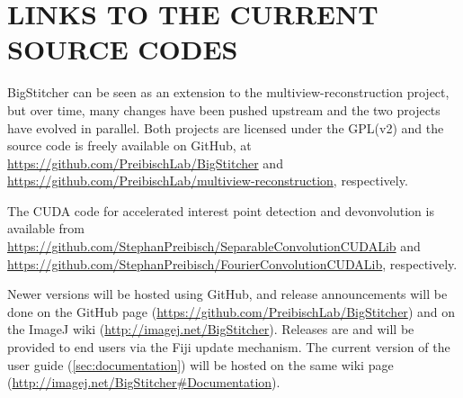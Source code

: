 \section{LINKS TO THE CURRENT SOURCE CODES}
\label{sec:currentcode}

BigStitcher can be seen as an extension to the multiview-reconstruction project, but over time, many changes have been pushed upstream and the two projects have evolved in parallel. Both projects are licensed under the GPL(v2) and the source code is freely available on GitHub, at \url{https://github.com/PreibischLab/BigStitcher} and \url{https://github.com/PreibischLab/multiview-reconstruction}, respectively.

The CUDA code for accelerated interest point detection and devonvolution is available from \url{https://github.com/StephanPreibisch/SeparableConvolutionCUDALib} and \url{https://github.com/StephanPreibisch/FourierConvolutionCUDALib}, respectively.

Newer versions will be hosted using GitHub, and release announcements will be done on the GitHub page (\url{https://github.com/PreibischLab/BigStitcher}) and on the ImageJ wiki (\url{http://imagej.net/BigStitcher}). Releases are and will be provided to end users via the Fiji update mechanism. The current version of the user guide (\ref{sec:documentation}) will be hosted on the same wiki page (\url{http://imagej.net/BigStitcher#Documentation}).